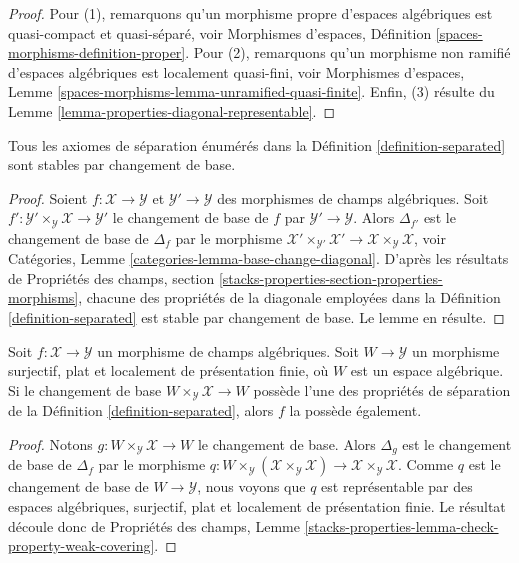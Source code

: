 \begin{proof}
Pour (1), remarquons qu'un morphisme propre d'espaces algébriques est
quasi-compact et quasi-séparé, voir Morphismes d'espaces, Définition
\ref{spaces-morphisms-definition-proper}. Pour (2), remarquons qu'un
morphisme non ramifié d'espaces algébriques est localement quasi-fini, voir
Morphismes d'espaces, Lemme
\ref{spaces-morphisms-lemma-unramified-quasi-finite}.
Enfin, (3) résulte du Lemme \ref{lemma-properties-diagonal-representable}.
\end{proof}

\begin{lemma}
\label{lemma-base-change-separated}
Tous les axiomes de séparation énumérés dans la Définition
\ref{definition-separated} sont stables par changement de base.
\end{lemma}

\begin{proof}
Soient $f : \mathcal{X} \to \mathcal{Y}$ et
$\mathcal{Y}' \to \mathcal{Y}$ des morphismes de champs algébriques.
Soit $f' : \mathcal{Y}' \times_\mathcal{Y} \mathcal{X} \to \mathcal{Y}'$
le changement de base de $f$ par $\mathcal{Y}' \to \mathcal{Y}$.
Alors $\Delta_{f'}$ est le changement de base de $\Delta_f$ par le morphisme
$\mathcal{X}' \times_{\mathcal{Y}'} \mathcal{X}' \to
\mathcal{X} \times_\mathcal{Y} \mathcal{X}$, voir Catégories, Lemme
\ref{categories-lemma-base-change-diagonal}. D'après les résultats de
Propriétés des champs,
section \ref{stacks-properties-section-properties-morphisms}, chacune des
propriétés de la diagonale employées dans la Définition
\ref{definition-separated} est stable par changement de base. Le lemme en
résulte.
\end{proof}

\begin{lemma}
\label{lemma-check-separated-covering}
Soit $f : \mathcal{X} \to \mathcal{Y}$ un morphisme de champs algébriques.
Soit $W \to \mathcal{Y}$ un morphisme surjectif, plat et localement de
présentation finie, où $W$ est un espace algébrique. Si le changement de base
$W \times_\mathcal{Y} \mathcal{X} \to W$ possède l'une des propriétés de
séparation de la Définition \ref{definition-separated}, alors $f$ la possède
également.
\end{lemma}

\begin{proof}
Notons $g : W \times_\mathcal{Y} \mathcal{X} \to W$ le changement de base.
Alors $\Delta_g$ est le changement de base de $\Delta_f$ par le morphisme
$q : W \times_\mathcal{Y} (\mathcal{X} \times_\mathcal{Y} \mathcal{X})
\to \mathcal{X} \times_\mathcal{Y} \mathcal{X}$. Comme $q$ est le changement
de base de $W \to \mathcal{Y}$, nous voyons que $q$ est représentable par des espaces
algébriques, surjectif, plat et localement de présentation finie. Le résultat
découle donc de Propriétés des champs, Lemme
\ref{stacks-properties-lemma-check-property-weak-covering}.
\end{proof}

